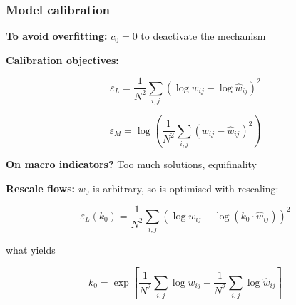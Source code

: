 \begin{frame}[label=calibration]

\frametitle{Model calibration}

\footnotesize

\textbf{To avoid overfitting:} $c_0 = 0$ to deactivate the mechanism

\bigskip

\textbf{Calibration objectives:}

\[
\varepsilon_L = \frac{1}{N^2} \sum_{i,j} \left(\log w_{ij} - \log \hat{w}_{ij} \right)^2
\]

\[
\varepsilon_M = \log\left(\frac{1}{N^2} \sum_{i,j} \left(w_{ij} - \hat{w}_{ij}\right)^2 \right)
\]

\bigskip

\textbf{On macro indicators?} Too much solutions, equifinality

\bigskip

\textbf{Rescale flows:} $w_0$ is arbitrary, so is optimised with rescaling:

\[
\varepsilon_L (k_0) = \frac{1}{N^2} \sum_{i,j} \left(\log w_{ij} - \log \left(k_0 \cdot \hat{w}_{ij} \right) \right)^2
\]

what yields

\[
k_0 = \exp \left[\frac{1}{N^2} \sum_{i,j} \log w_{ij} - \frac{1}{N^2} \sum_{i,j} \log \hat{w}_{ij} \right]
\]



\hyperlink{calibmain}{}

\end{frame}











